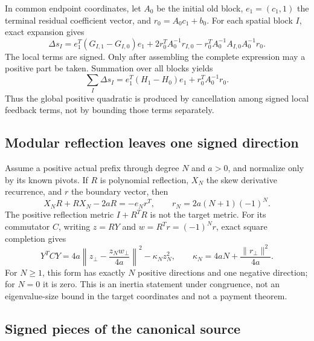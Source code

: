 \documentclass[11pt]{article}
\theoremstyle{definition}
\theoremstyle{remark}
\begin{document}
In common endpoint coordinates, let $A_0$ be the initial old block,
$e_1=(c_1,1)$ the terminal residual coefficient vector, and
$r_0=A_0c_1+b_0$. For each spatial block $I$, exact expansion gives
\begin{equation}
 \Delta s_I
 =e_1^T(G_{I,1}-G_{I,0})e_1
 +2r_0^TA_0^{-1}r_{I,0}
 -r_0^TA_0^{-1}A_{I,0}A_0^{-1}r_0.
 \label{eq:local-feedback}
\end{equation}
The local terms are signed. Only after assembling the complete expression may
a positive part be taken. Summation over all blocks yields
\begin{equation}
 \sum_I\Delta s_I
 =e_1^T(H_1-H_0)e_1+r_0^TA_0^{-1}r_0.
 \label{eq:joint-feedback}
\end{equation}
Thus the global positive quadratic is produced by cancellation among signed
local feedback terms, not by bounding those terms separately.

\subsection{Modular reflection leaves one signed direction}

Assume a positive actual prefix through degree $N$ and $a>0$, and normalize
only by its known pivots. If $R$ is polynomial reflection, $X_N$ the skew
derivative recurrence, and $r$ the boundary vector, then
\begin{equation}
 X_NR+RX_N-2aR=-e_Nr^T,
 \qquad r_N=2a(N+1)(-1)^N.
\end{equation}
The positive reflection metric $I+R^TR$ is not the target metric. For its
commutator $C$, writing $z=RY$ and $w=R^Tr=(-1)^Nr$, exact square completion
gives
\begin{equation}
 Y^TCY
 =4a\left\|z_\perp-\frac{z_Nw_\perp}{4a}\right\|^2
 -\kappa_Nz_N^2,
 \qquad
 \kappa_N=4aN+\frac{\|r_\perp\|^2}{4a}.
 \label{eq:one-negative}
\end{equation}
For $N\ge1$, this form has exactly $N$ positive directions and one negative
direction; for $N=0$ it is zero. This is an inertia statement under
congruence, not an eigenvalue-size bound in the target coordinates and not a
payment theorem.

\subsection{Signed pieces of the canonical source}
\end{document}
